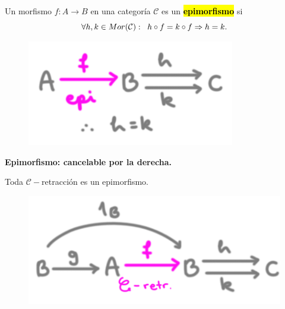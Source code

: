 \documentclass[10pt]{article}
\newcommand{\hlgray}[1]{{\sethlcolor{Ivory2}\hl{#1}}}
\newtheorem[M]{teo}{Teorema}[section]
\newtheorem[M]{listaObj}[teo]{Lista de deseos}
\newtheorem[M]{preg}[teo]{Pregunta}
\newtheorem[M]{lema}[teo]{Lema}
\newtheorem[M]{hip}[teo]{Hipótesis}
\newtheorem[M]{prop}[teo]{Proposición}
\newtheorem[M]{obs}[teo]{Observación}
\newtheorem[M]{cor}[teo]{Corolario}
\newtheorem[M]{notacion}[teo]{Notación}
\newtheorem[M]{nota}[teo]{Nota}
\begin{document}
\begin{minipage}{0.5\textwidth}
\begin{defi}
Un morfismo $f: A \longrightarrow B$ en una categoría 
$\mathcal{C}$ es un \textbf{\hlgray{epimorfismo}} si
\[
\forall h, k \in Mor(\mathcal{C}): \hspace{0.2cm}
h \circ f = k \circ f \Rightarrow h = k.
\]
\end{defi}
\end{minipage} \hfill
\begin{minipage}{0.45\textwidth}

\begin{figure}[H]
\centering
	\includegraphics[scale=2.5]{cat6} 
 \end{figure}
\end{minipage}

\begin{center}
\textbf{Epimorfismo: cancelable por la derecha.}
\end{center}

\begin{minipage}{0.5\textwidth}
\begin{prop}
Toda $\mathcal{C}-$retracción es un epimorfismo.
\end{prop}
\end{minipage} \hfill
\begin{minipage}{0.45\textwidth}
\begin{figure}[H]
\centering
	\includegraphics[scale=2.5]{cat7} 
 \end{figure}
\end{minipage}
\end{document}
